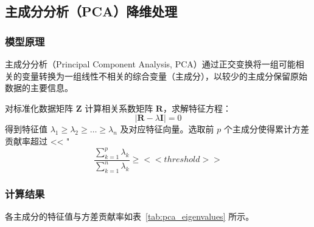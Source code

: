 
\subsection{主成分分析（PCA）降维处理}

\subsubsection{模型原理}

主成分分析（Principal Component Analysis, PCA）通过正交变换将一组可能相关的变量转换为一组线性不相关的综合变量（主成分），以较少的主成分保留原始数据的主要信息。

对标准化数据矩阵 $\mathbf{Z}$ 计算相关系数矩阵 $\mathbf{R}$，求解特征方程：
\begin{equation}
    |\mathbf{R} - \lambda \mathbf{I}| = 0
\end{equation}
得到特征值 $\lambda_1 \geq \lambda_2 \geq \ldots \geq \lambda_n$ 及对应特征向量。选取前 $p$ 个主成分使得累计方差贡献率超过 << "%
\begin{equation}
    \frac{\sum_{k=1}^{p} \lambda_k}{\sum_{k=1}^{n} \lambda_k} \geq << threshold >>
\end{equation}

\subsubsection{计算结果}

各主成分的特征值与方差贡献率如表~\ref{tab:pca_eigenvalues} 所示。

